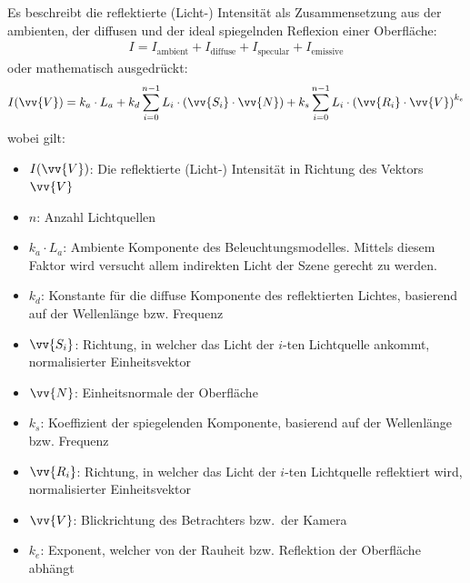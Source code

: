 
Es beschreibt die reflektierte (Licht-) Intensität als Zusammensetzung aus der ambienten, der diffusen und der ideal spiegelnden Reflexion einer Oberfläche:
\begin{gather}
    I = I_{\text{ambient}} + I_{\text{diffuse}} + I_{\text{specular}} + I_{\text{emissive}}
\end{gather}
oder mathematisch ausgedrückt:
\begin{gather}
    I(\vv{V}) = k_{a} \cdot L_{a} +
                k_{d} \displaystyle\sum_{i=0}^{n - 1} L_{i} \cdot (\vv{S_{i}} \cdot \vv{N}) +
                k_{s} \displaystyle\sum_{i=0}^{n - 1} L_{i} \cdot {(\vv{R_{i}} \cdot \vv{V})}^{k_{e}}
\end{gather}
wobei gilt:
\begin{itemize}
    \item $I(\vv{V})$:              Die reflektierte (Licht-) Intensität in Richtung des Vektors $\vv{V}$
    \item $n$:                      Anzahl Lichtquellen
    \item $k_{a} \cdot L_{a}$:      Ambiente Komponente des
                                    Beleuchtungsmodelles. Mittels diesem Faktor
                                    wird versucht allem indirekten Licht der
                                    Szene gerecht zu werden.
    \item $k_{d}$:                  Konstante für die diffuse Komponente des
                                    reflektierten Lichtes, basierend auf der
                                    Wellenlänge bzw. Frequenz
    \item $\vv{S_{i}}$:             Richtung, in welcher das Licht der $i$-ten
                                    Lichtquelle ankommt, normalisierter
                                    Einheitsvektor
    \item $\vv{N}$:                 Einheitsnormale der Oberfläche
    \item $k_{s}$:                  Koeffizient der spiegelenden Komponente,
                                    basierend auf der Wellenlänge bzw. Frequenz
    \item $\vv{R_{i}}$:             Richtung, in welcher das Licht der $i$-ten
                                    Lichtquelle reflektiert wird,
                                    normalisierter Einheitsvektor
    \item $\vv{V}$:                 Blickrichtung des Betrachters bzw.\ der
                                    Kamera
    \item $k_{e}$:                  Exponent, welcher von der Rauheit bzw.
                                    Reflektion der Oberfläche abhängt
\end{itemize}

